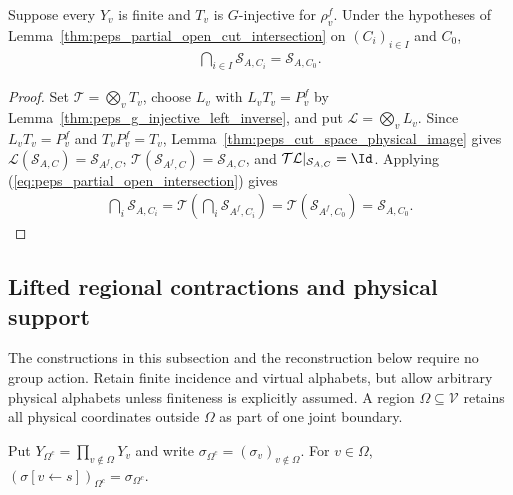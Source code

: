 \begin{lemma}%
    \label{thm:peps_open_cut_intersection}
    \leanok
    Suppose every $Y_v$ is finite and $T_v$ is $G$-injective for $\rho_v^f$.
    Under the hypotheses of Lemma~\ref{thm:peps_partial_open_cut_intersection}
    on $(C_i)_{i\in I}$ and $C_0$,
    \begin{align}
        \bigcap_{i\in I}\mathcal S_{A,C_i}=\mathcal S_{A,C_0}.
        \label{eq:peps_open_cut_intersection}
    \end{align}
\end{lemma}
\begin{proof}\leanok
    Set $\mathcal T=\bigotimes_vT_v$, choose $L_v$ with $L_vT_v=P_v^f$ by
    Lemma~\ref{thm:peps_g_injective_left_inverse}, and put
    $\mathcal L=\bigotimes_vL_v$. Since $L_vT_v=P_v^f$ and $T_vP_v^f=T_v$,
    Lemma~\ref{thm:peps_cut_space_physical_image} gives
    $\mathcal L(\mathcal S_{A,C})=\mathcal S_{A^f,C}$,
    $\mathcal T(\mathcal S_{A^f,C})=\mathcal S_{A,C}$, and
    $\mathcal T\mathcal L|_{\mathcal S_{A,C}}=\Id$. Applying
    (\ref{eq:peps_partial_open_intersection}) gives
    \begin{align}
        \bigcap_i\mathcal S_{A,C_i}
        =\mathcal T\left(\bigcap_i\mathcal S_{A^f,C_i}\right)
        =\mathcal T(\mathcal S_{A^f,C_0})
        =\mathcal S_{A,C_0}.
        \label{eq:peps_open_inverse_transport}
    \end{align}
\end{proof}

\subsection{Lifted regional contractions and physical support}
\label{sec:peps_lifted_cut_support}

The constructions in this subsection and the reconstruction below require
no group action. Retain finite incidence and virtual alphabets, but allow
arbitrary physical alphabets unless finiteness is explicitly assumed.
A region $\Omega\subseteq\mathcal V$ retains all physical coordinates
outside $\Omega$ as part of one joint boundary.

\begin{definition}%
    \label{def:peps_outside_physical_config}
    \leanok
    Put $Y_{\Omega^c}=\prod_{v\notin\Omega}Y_v$ and write
    $\sigma_{\Omega^c}=(\sigma_v)_{v\notin\Omega}$. For $v\in\Omega$,
    $(\sigma[v\leftarrow s])_{\Omega^c}=\sigma_{\Omega^c}$.
\end{definition}

